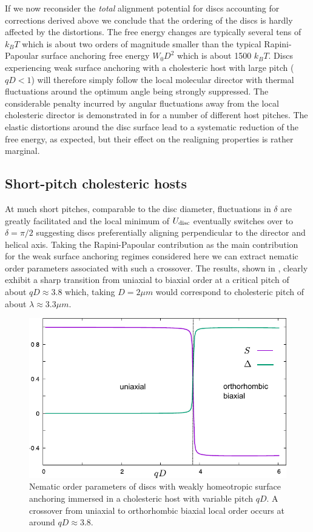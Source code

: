  If we now reconsider the {\em total} alignment potential for discs accounting for corrections derived above we conclude that the ordering of the discs is hardly affected by the distortions. The free energy changes are typically several tens of $k_{B}T$ which is about two orders of magnitude smaller than the typical Rapini-Papoular surface anchoring free energy $ W_{0} D^{2} $ which is about 1500 $k_{B}T$. Discs experiencing weak surface anchoring with  a cholesteric host with large pitch ($qD <1$)  will therefore simply follow the local molecular director with thermal fluctuations around the optimum angle being strongly suppressed. The considerable penalty incurred  by angular fluctuations away from the local cholesteric director is demonstrated in  for a number of different host pitches. The elastic distortions around the disc surface lead to a systematic reduction of the free energy, as expected, but their effect on the realigning properties is rather marginal.


 \subsection{Short-pitch cholesteric hosts}


 At much short pitches,  comparable to the disc diameter, fluctuations in $\delta$ are greatly facilitated and the local minimum of $U_{\rm disc}$ eventually switches over to $\delta = \pi/2$ suggesting  discs  preferentially aligning perpendicular to the director and helical axis.  Taking the Rapini-Papoular contribution  as the main contribution for the weak surface anchoring regimes considered here we can extract  nematic order parameters associated with such a crossover.  The results, shown in , clearly exhibit a sharp transition from uniaxial to biaxial order at a critical pitch of about $qD \approx 3.8$ which, taking $D =2 \mu m$ would correspond to cholesteric pitch of about $\lambda \approx 3.3 \mu m$.



\begin{figure}
	\includegraphics[width =  .8\columnwidth]{figures/chapter-4/discubx}
	\caption{Nematic order parameters of discs with weakly homeotropic surface anchoring immersed in a cholesteric host with variable pitch $qD$. A crossover from uniaxial to orthorhombic biaxial local order occurs at around $qD \approx 3.8$.  }
	\label{disop}
\end{figure}





\clearpage